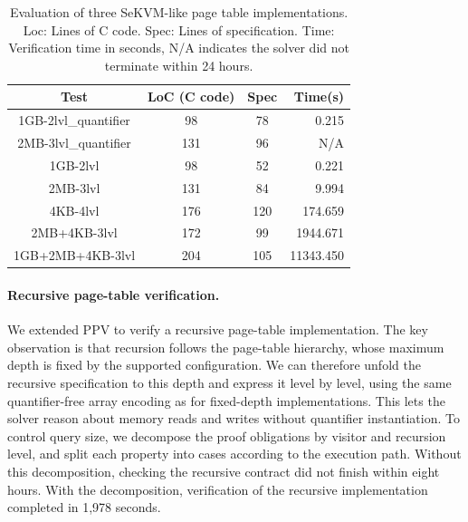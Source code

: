 \begin{table}
\centering
\caption{Evaluation of three SeKVM-like page table implementations. Loc: Lines of C code. Spec: Lines of specification. Time: Verification time in seconds, N/A indicates the solver did not terminate within 24 hours.}
\label{tbl:results}
{\footnotesize
 \begin{tabular}{cccr}
 \toprule
 \footnotesize
 \textbf{Test} & \textbf{LoC (C code)} & \textbf{Spec} & \textbf{Time(s)} \\
 \midrule
 1GB-2lvl\_quantifier & 98 & 78 & 0.215\\
 \midrule
 2MB-3lvl\_quantifier & 131 & 96 & N/A\\
 
 \midrule
 1GB-2lvl & 98 & 52 & 0.221 \\
 \midrule
 2MB-3lvl & 131 & 84 & 9.994 \\
 \midrule
 4KB-4lvl & 176 & 120 & 174.659\\
 \midrule
 2MB+4KB-3lvl & 172 & 99 & 1944.671 \\
  \midrule
 1GB+2MB+4KB-3lvl & 204 & 105 & 11343.450 \\
 \bottomrule
 \end{tabular}}
\end{table}


{\color{blue}
\paragraph{Recursive page-table verification.}
We extended PPV to verify a recursive page-table implementation.
The key observation is that recursion follows the page-table hierarchy,
whose maximum depth is fixed by the supported configuration.
We can therefore unfold the recursive specification to this depth and
express it level by level, using the same quantifier-free array encoding
as for fixed-depth implementations.
This lets the solver reason about memory reads and writes without
quantifier instantiation.
To control query size, we decompose the proof obligations by visitor
and recursion level, and split each property into cases according to
the execution path.
Without this decomposition, checking the recursive contract did not
finish within eight hours.
With the decomposition, verification of the recursive implementation
completed in 1,978 seconds.
}

